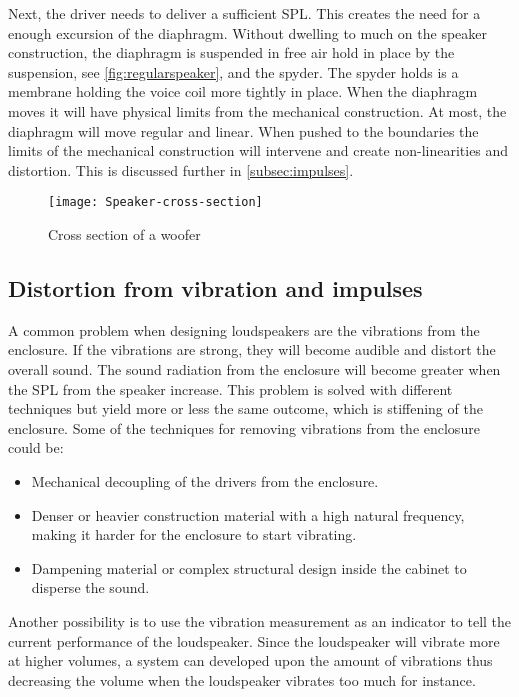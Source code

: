 Next, the driver needs to deliver a sufficient \gls{SPL}. This creates the need for a enough excursion of the diaphragm. Without dwelling to much on the speaker construction, the diaphragm is suspended in free air hold in place by the suspension, see \autoref{fig:regularspeaker}, and the spyder. The spyder holds is a membrane holding the voice coil more tightly in place. When the diaphragm moves it will have physical limits from the mechanical construction. At most, the diaphragm will move regular and linear. When pushed to the boundaries the limits of the mechanical construction will intervene and create non-linearities and distortion. This is discussed further in \autoref{subsec:impulses}.

\begin{figure}
\centering
\texttt{[image: Speaker-cross-section]}
\caption{Cross section of a woofer}
\label{fig:louderspeakerCrossSection}
\end{figure}



\subsection{Distortion from vibration and impulses}\label{subsec:impulses}

A common problem when designing loudspeakers are the vibrations from the enclosure. If the vibrations are strong, they will become audible and distort the overall sound. The sound radiation from the enclosure will become greater when the \gls{SPL} from the speaker increase. This problem is solved with different techniques but yield more or less the same outcome, which is stiffening of the enclosure. Some of the techniques for removing vibrations from the enclosure could be:
\begin{itemize}
\item Mechanical decoupling of the drivers from the enclosure.
\item Denser or heavier construction material with a high natural frequency, making it harder for the enclosure to start vibrating.
\item Dampening material or complex structural design inside the cabinet to disperse the sound.
\end{itemize}

Another possibility is to use the vibration measurement as an indicator to tell the current performance of the loudspeaker. Since the loudspeaker will vibrate more at higher volumes, a system can developed upon the amount of vibrations thus decreasing the volume when the loudspeaker vibrates too much for instance.


